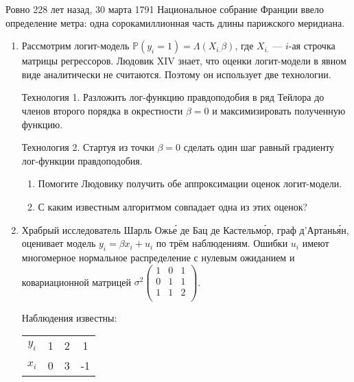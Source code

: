 \documentclass[12pt]{article}
\def \P{\mathbb{P}}
\begin{document}

\vspace{10pt}

Ровно 228 лет назад, 30 марта 1791 Национальное собрание Франции ввело определение метра: одна сорокамиллионная часть длины парижского меридиана.


\begin{enumerate}
\item Рассмотрим логит-модель $\P(y_i = 1) = \Lambda(X_{i.}\beta)$, где $X_{i.}$ — $i$-ая строчка матрицы
регрессоров. Людовик XIV знает, что оценки логит-модели в явном виде аналитически не считаются. Поэтому он использует две технологии.

Технология 1. Разложить лог-функцию правдоподобия в ряд Тейлора до членов второго порядка в окрестности $\beta=0$ и максимизировать полученную функцию.

Технология 2. Стартуя из точки $\beta = 0$ сделать один шаг равный градиенту лог-функции правдоподобия.


\begin{enumerate}
  \item Помогите Людовику получить обе аппроксимации оценок логит-модели.
  \item С каким известным алгоритмом совпадает одна из этих оценок?
\end{enumerate}


\item Храбрый исследователь Шарль Ожье́ де Бац де Кастельмо́р, граф д'Артанья́н, оценивает модель $y_i = \beta x_i + u_i$ по трём наблюдениям.
Ошибки $u_i$ имеют многомерное нормальное распределение с нулевым ожиданием и ковариационной матрицей
$\sigma^2\begin{pmatrix}
1 & 0 & 1 \\
0 & 1 & 1 \\
1 & 1 & 2 \\
\end{pmatrix}$.

Наблюдения известны:

\begin{tabular}{cccc}
\toprule
$y_i$ & 1 & 2 & 1  \\
$x_i$ & 0 & 3 & -1 \\
\bottomrule
\end{tabular}



\end{enumerate}
\end{document}
